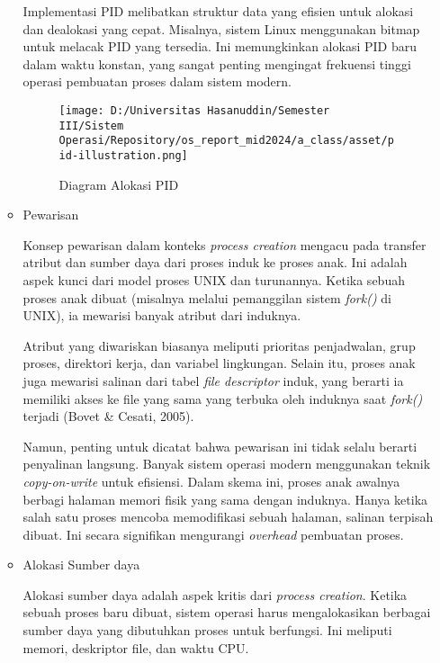\documentclass[12pt]{article}
\begin{document}
\begin{itemize}
\begin{itemize}
        Implementasi PID melibatkan struktur data yang efisien 
        untuk alokasi dan dealokasi yang cepat. Misalnya, sistem 
        Linux menggunakan bitmap untuk melacak PID yang tersedia. 
        Ini memungkinkan alokasi PID baru dalam waktu konstan, 
        yang sangat penting mengingat frekuensi tinggi operasi 
        pembuatan proses dalam sistem modern.

        \begin{figure}[h]
            \centering
            \texttt{[image: D:/Universitas Hasanuddin/Semester III/Sistem Operasi/Repository/os\_report\_mid2024/a\_class/asset/pid-illustration.png]}
            \caption{Diagram Alokasi PID}
        \end{figure}

        \item Pewarisan
        
        Konsep pewarisan dalam konteks \textit{process creation} 
        mengacu pada transfer atribut dan sumber daya dari proses 
        induk ke proses anak. Ini adalah aspek kunci dari model 
        proses UNIX dan turunannya. Ketika sebuah proses anak 
        dibuat (misalnya melalui pemanggilan sistem 
        \textit{fork()} di UNIX), ia mewarisi banyak atribut dari 
        induknya.

        Atribut yang diwariskan biasanya meliputi prioritas 
        penjadwalan, grup proses, direktori kerja, dan variabel 
        lingkungan. Selain itu, proses anak juga mewarisi salinan 
        dari tabel \textit{file descriptor} induk, yang berarti 
        ia memiliki akses ke file yang sama yang terbuka oleh 
        induknya saat \textit{fork()} terjadi (Bovet \& Cesati, 
        2005).

        Namun, penting untuk dicatat bahwa pewarisan ini tidak 
        selalu berarti penyalinan langsung. Banyak sistem operasi 
        modern menggunakan teknik \textit{copy-on-write} untuk 
        efisiensi. Dalam skema ini, proses anak awalnya berbagi 
        halaman memori fisik yang sama dengan induknya. Hanya 
        ketika salah satu proses mencoba memodifikasi sebuah 
        halaman, salinan terpisah dibuat. Ini secara signifikan 
        mengurangi \textit{overhead} pembuatan proses.

        \item Alokasi Sumber daya
        
        Alokasi sumber daya adalah aspek kritis dari 
        \textit{process creation}. Ketika sebuah proses baru 
        dibuat, sistem operasi harus mengalokasikan berbagai 
        sumber daya yang dibutuhkan proses untuk berfungsi. Ini 
        meliputi memori, deskriptor file, dan waktu CPU.


\end{itemize}
\end{itemize}
\end{document}
